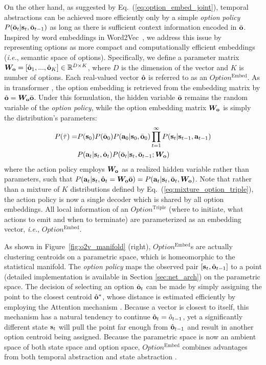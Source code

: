 \documentclass[10pt,journal,compsoc]{IEEEtran}
\renewcommand{\cite}{\citep}
\begin{document}
On the other hand, as suggested by
Eq.~(\ref{eq:option_embed_joint}), temporal abstractions can be
achieved more efficiently only by a simple \emph{option
  policy} $P(\bar{{\mathbf{o}}}_t|{\mathbf{s}}_t,\bar{{\mathbf{o}}}_{t-1})$ as long as
there is sufficient context information encoded in $\bar{{\mathbf{o}}}$.
Inspired by word embeddings in
Word2Vec~\cite{mikolov2013distributed}, we address this issue by
representing options as more compact and computationally
efficient embeddings (\textit{i.e.}, semantic space of options).
Specifically, we define a parameter matrix
${\bm{W}}_{\mathbf{o}}=[\hat{{\mathbf{o}}}_1,...,\hat{{\mathbf{o}}}_K]\in{\mathbb{R}}^{D\times K}$,
where $D$ is the dimension of the vector and $K$ is number of
options. Each real-valued vector $\hat{{\mathbf{o}}}$ is referred to as
an $Option^{\textrm{Embed}}$. As in transformer
\cite{vaswani2017attention}, the option embedding is retrieved
from the embedding matrix by $\hat{{\mathbf{o}}}={\bm{W}}_{{\mathbf{o}}}\bar{{\mathbf{o}}}$.
Under this formulation, the hidden variable $\bar{{\mathbf{o}}}$ remains 
the random variable of the \emph{option policy}, while the option 
embedding matrix ${\bm{W}}_{{\mathbf{o}}}$ is simply the distribution's parameters:
\begin{align}
  \label{eq:option_hat_joint}
  P(\bar{\tau}) =&    
  P(\rvs_0)P(\bar{\rvo}_0)P(\rva_0|\rvs_0,\bar{\rvo}_0)
  \prod_{t=1}^\infty P(\rvs_t|\rvs_{t-1},\rva_{t-1})\nonumber\\
  &P(\rva_{t}|\rvs_{t},\hat{\rvo}_{t})P(\bar{\rvo}_t|\rvs_t,\bar{\rvo}_{t-1};\mW_{\rvo})
\end{align}
where the action policy employs ${\bm{W}}_{{\mathbf{o}}}$ as a realized hidden
variable rather than parameters, such that
$P({\mathbf{a}}_{t}|{\mathbf{s}}_{t},\hat{{\mathbf{o}}}_{t}={\bm{W}}_{{\mathbf{o}}}\bar{{\mathbf{o}}})=P({\mathbf{a}}_{t}|{\mathbf{s}}_{t},\bar{{\mathbf{o}}}_{t},{\bm{W}}_{{\mathbf{o}}})$.
Note that rather than a mixture of $K$ distributions defined by
Eq.~(\ref{eq:mixture_option_triple}), the action policy is now a
single decoder which is shared by all option embeddings. All
local information of an $Option^{\textrm{Triple}}$ (where to initiate,
what actions to emit and when to terminate) are parameterized as
an embedding vector, \textit{i.e.},
$Option^{\textrm{Embed}}$.

As shown in Figure~\ref{fig:o2v_manifold} (right), $Option^{\textrm{Embed}}$s are
actually clustering centroids on a parametric space, which is
homeomorphic to the statistical manifold. The \emph{option
  policy} maps the observed pair $[{\mathbf{s}}_t,\hat{{\mathbf{o}}}_{t-1}]$ to a
point (detailed implementation is available in Section \ref{sec:net_arch})
on the parametric space. The decision of selecting an option
$\hat{{\mathbf{o}}}_t$ can be made by simply assigning the point to the
closest centroid $\hat{{\mathbf{o}}}^*$, whose distance is estimated
efficiently by employing the Attention mechanism
\cite{vaswani2017attention}. Because a vector is closest to
itself, this mechanism has a natural tendency to continue
$\hat{{\mathbf{o}}}_t=\hat{o}_{t-1}$, yet a significantly different state
${\mathbf{s}}_t$ will pull the point far enough from $\hat{{\mathbf{o}}}_{t-1}$
and result in another option centroid being assigned. Because the
parametric space is now an ambient space of both state space and
option space, $Option^{\textrm{Embed}}$ combines advantages from both
temporal abstraction and state abstraction
\cite{knoblock1990learning}.
\end{document}
